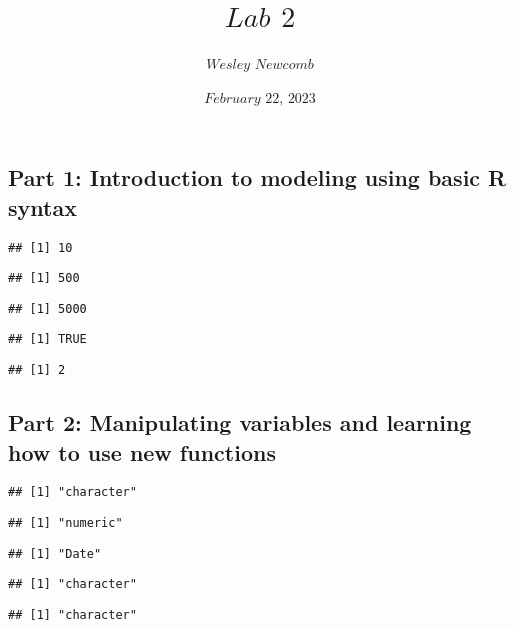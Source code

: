 \documentclass[
]{article}
\title{\(Lab\) \(2\)}
\author{\(Wesley\) \(Newcomb\)}
\date{\(February\) \(22\), \(2023\)}
\begin{document}
\maketitle

\hypertarget{part-1-introduction-to-modeling-using-basic-r-syntax}{%
\subsection{Part 1: Introduction to modeling using basic R
syntax}\label{part-1-introduction-to-modeling-using-basic-r-syntax}}

\begin{verbatim}
## [1] 10
\end{verbatim}

\begin{verbatim}
## [1] 500
\end{verbatim}

\begin{verbatim}
## [1] 5000
\end{verbatim}

\begin{verbatim}
## [1] TRUE
\end{verbatim}

\begin{verbatim}
## [1] 2
\end{verbatim}

\hypertarget{part-2-manipulating-variables-and-learning-how-to-use-new-functions}{%
\subsection{Part 2: Manipulating variables and learning how to use new
functions}\label{part-2-manipulating-variables-and-learning-how-to-use-new-functions}}

\begin{verbatim}
## [1] "character"
\end{verbatim}

\begin{verbatim}
## [1] "numeric"
\end{verbatim}

\begin{verbatim}
## [1] "Date"
\end{verbatim}

\begin{verbatim}
## [1] "character"
\end{verbatim}

\begin{verbatim}
## [1] "character"
\end{verbatim}
\end{document}
